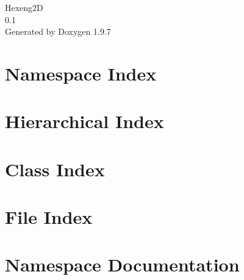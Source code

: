 \documentclass[twoside]{book}
\newcommand{\+}{\discretionary{\mbox{\scriptsize$\hookleftarrow$}}{}{}}
\newcommand{\clearemptydoublepage}{%
    \newpage{\pagestyle{empty}\cleardoublepage}%
  }
\begin{document}
  \raggedbottom
    \hypersetup{pageanchor=false,
                bookmarksnumbered=true,
                pdfencoding=unicode
               }
  \begin{titlepage}
  \vspace*{7cm}
  \begin{center}%
  {\Large Hexeng2D}\\
  [1ex]\large 0.\+1 \\
  \vspace*{1cm}
  {\large Generated by Doxygen 1.9.7}\\
  \end{center}
  \end{titlepage}
  \clearemptydoublepage
  \tableofcontents
  \clearemptydoublepage
  \hypersetup{pageanchor=true}
\chapter{Namespace Index}

\chapter{Hierarchical Index}

\chapter{Class Index}

\chapter{File Index}

\chapter{Namespace Documentation}






\end{document}
